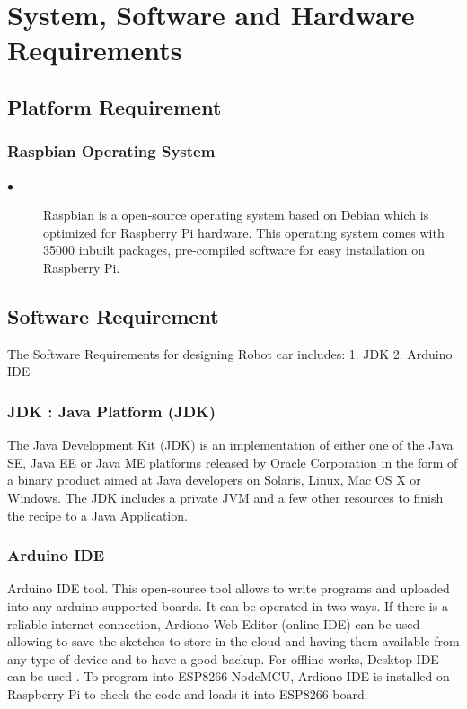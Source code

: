 \documentclass[sigconf]{acmart}
\begin{document}
\section{System, Software and Hardware Requirements}
\subsection{Platform Requirement}
\subsubsection{Raspbian Operating System}
\begin{description}
\item[$\bullet$] Raspbian is a open-source operating system based on Debian which is optimized for Raspberry Pi hardware. This operating system comes with 35000 inbuilt packages, pre-compiled software for easy installation on Raspberry Pi.
\end{description}

\subsection{Software Requirement}
The Software Requirements for designing Robot car includes:
1. JDK
2. Arduino IDE

\subsubsection{JDK : Java Platform (JDK)}
The Java Development Kit (JDK) is an implementation
of either one of the Java SE, Java EE or Java ME platforms released by Oracle Corporation in the form of a binary product aimed at Java developers on Solaris, Linux, Mac OS X or Windows. The JDK includes a private JVM and a few other resources to finish the recipe to a Java Application.

\subsubsection{Arduino IDE}
Arduino IDE tool. This open-source tool allows to write programs and uploaded into any arduino supported boards. It can be operated in two ways. If there is a reliable internet connection, Ardiono Web Editor (online IDE) can be used allowing to save the sketches to store in the cloud and having them available from any type of device and to have a good backup. For offline works, Desktop IDE can be used \cite{arduino2015}. To program into ESP8266 NodeMCU, Ardiono IDE is installed on Raspberry Pi to check the code and loads it into ESP8266 board.
\end{document}
